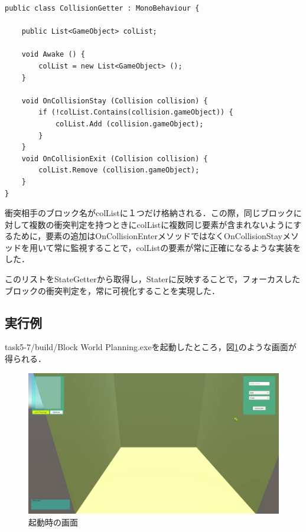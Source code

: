\documentclass[12pt]{jarticle}
\begin{document}
\begin{lstlisting}[caption=CollisionGetterクラス, label=src:collision]
public class CollisionGetter : MonoBehaviour {

    public List<GameObject> colList;

    void Awake () {
        colList = new List<GameObject> ();
    }

    void OnCollisionStay (Collision collision) {
        if (!colList.Contains(collision.gameObject)) {
            colList.Add (collision.gameObject);
        }
    }
    void OnCollisionExit (Collision collision) {
        colList.Remove (collision.gameObject);
    }
}
\end{lstlisting}

衝突相手のブロック名がcolListに１つだけ格納される．この際，同じブロックに対して複数の衝突判定を持つときにcolListに複数同じ要素が含まれないようにするために，要素の追加はOnCollisionEnterメソッドではなくOnCollisionStayメソッドを用いて常に監視することで，colListの要素が常に正確になるような実装をした．

このリストをStateGetterから取得し，Staterに反映することで，フォーカスしたブロックの衝突判定を，常に可視化することを実現した．

\subsection{実行例}
task5-7/build/Block World Planning.exeを起動したところ，図\ref{fig:run0}のような画面が得られる．

\begin{figure}[!hbt]
  	\begin{center}
  		\includegraphics[scale=0.2]{images/BWP_Work6/bwp0.jpg}
	\end{center}
  	\caption{起動時の画面}
  	\label{fig:run0}
\end{figure}
\clearpage
\end{document}
